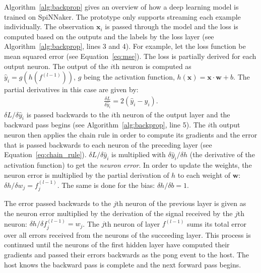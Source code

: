 \documentclass[]{article}
\begin{document}
Algorithm~\ref{alg:backprop} gives an overview of how a deep
learning model is trained on SpiNNaker.
The prototype only supports streaming each example individually.
The observation $\mathbf{x}_i$ is passed through the model and the
loss is computed based on the outputs and the labels by the loss layer
(see Algorithm~\ref{alg:backprop}, lines 3 and 4).
For example, let the loss function be mean squared error
(see Equation~\ref{eq:mse}).
The loss is partially derived for each output neuron.
The output of the $i$th neuron is computed as
$\hat{y}_i = g(h(f^{(l-1)}))$, $g$ being the activation function,
$h(\mathbf{x}) = \mathbf{x} \cdot \mathbf{w} + b$.
The partial derivatives in this case are given by:
\begin{align}
  \frac{\delta L}{\delta \hat{y}_i} = 2(\hat{y}_i - y_i).
\end{align}
$\delta L / \delta \hat{y}_i$ is passed backwards to the $i$th neuron
of the output layer and the backward pass begins (see
Algorithm~\ref{alg:backprop}, line 5).
The $i$th output neuron then applies the chain rule in order to
compute its gradients and the error that is passed backwards to each
neuron of the preceding layer (see Equation~\ref{eq:chain_rule}).
$\delta L / \delta \hat{y}_i$ is multiplied with
$\delta \hat{y}_i / \delta h$ (the derivative of the activation
function) to get the \textit{neuron error}.
In order to update the weights, the neuron error is multiplied by the
partial derivation of $h$ to each weight of $\mathbf{w}$:
$\delta h / \delta w_j = f^{(l - 1)}_j$.
The same is done for the bias: $\delta h / \delta b = 1$.

The error passed backwards to the $j$th neuron of the previous layer
is given as the neuron error multiplied by the derivation of the
signal received by the $j$th neuron:
$\delta h / \delta f^{(l-1)}_j = w_j$.
The $j$th neuron of layer $f^{(l-1)}$ sums its total error over all
errors received from the neurons of the succeeding layer.
This process is continued until the neurons of the first hidden layer
have computed their gradients and passed their errors backwards as
the pong event to the host.
The host knows the backward pass is complete and the next
forward pass begins.
\end{document}
